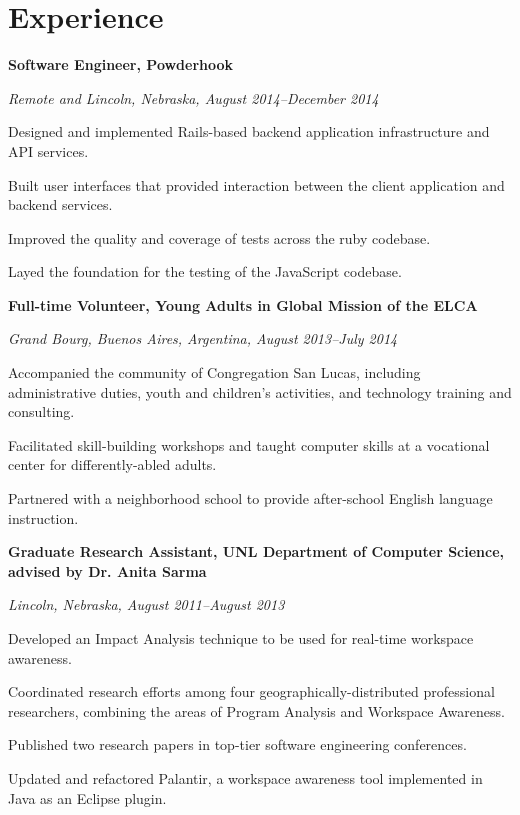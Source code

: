 \documentclass[10pt,letterpaper]{article}
\renewenvironment{itemize}{
  \begin{list}{}{
    \setlength{\leftmargin}{1.5em}
    \setlength{\itemsep}{0.25em}
    \setlength{\parskip}{0pt}
    \setlength{\parsep}{0.25em}
  }
}{
  \end{list}
}
\begin{document}
\section*{Experience}

\begin{itemize}
\item \textbf{Software Engineer, Powderhook}
\item \emph{Remote and Lincoln, Nebraska, August 2014--December 2014}
    \begin{itemize}
    \item Designed and implemented Rails-based backend application infrastructure and API
    services.
    \item Built user interfaces that provided interaction between the client
    application and backend services.
    \item Improved the quality and coverage of tests across the ruby
    codebase.
    \item Layed the foundation for the testing of the JavaScript codebase.
    \end{itemize}
\end{itemize}

\begin{itemize}
\item \textbf{Full-time Volunteer, Young Adults in Global Mission of the ELCA}
\item \emph{Grand Bourg, Buenos Aires, Argentina, August 2013--July 2014}
	\begin{itemize}
    \item Accompanied the community of Congregation San Lucas, including
    administrative duties, youth and children's activities, and technology
    training and consulting.
    \item Facilitated skill-building workshops and taught computer skills at
    a vocational center for differently-abled adults.
    \item Partnered with a neighborhood school to provide after-school
    English language instruction.
	\end{itemize}
\end{itemize}

\begin{itemize}
\item \textbf{Graduate Research Assistant, UNL Department of Computer Science, advised by Dr. Anita Sarma}
\item \emph{Lincoln, Nebraska, August 2011--August 2013}
	\begin{itemize}
	\item Developed an Impact Analysis technique to be used for real-time
    workspace awareness.
    \item Coordinated research efforts among four
    geographically-distributed
    professional researchers, combining the areas of Program Analysis and
    Workspace Awareness.
    \item Published two research papers in top-tier software engineering
    conferences.
	\item Updated and refactored Palantir, a workspace awareness tool
    implemented in Java as an Eclipse plugin.
	\end{itemize}
\end{itemize}
\end{document}
